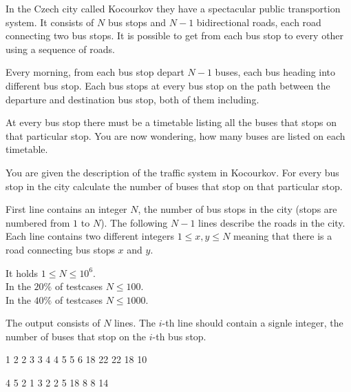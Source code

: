 





In the Czech city called Kocourkov they have a spectacular public transportion system.
It consists of $N$ bus stops and $N-1$ bidirectional roads, each road connecting two bus stops.
It is possible to get from each bus stop to every other using a sequence of roads.

Every morning, from each bus stop depart $N-1$ buses, each bus heading into different bus stop.
Each bus stops at every bus stop on the path between the departure and destination bus stop, both of them including.

At every bus stop there must be a timetable listing all the buses that stops on that particular stop.
You are now wondering, how many buses are listed on each timetable.


You are given the description of the traffic system in Kocourkov.
For every bus stop in the city calculate the number of buses that stop on that particular stop.


First line contains an integer $N$, the number of bus stops in the city (stops are numbered from $1$ to $N$).
The following $N-1$ lines describe the roads in the city.
Each line contains two different integers $1 \le x, y \le N$ meaning that there is a road connecting bus stops $x$ and $y$.

\smallskip
\noindent
It holds $1 \leq N \leq 10^6$.\\
In the $20\%$ of testcases $N \leq 100$.\\
In the $40\%$ of testcases $N \leq 1000$.


The output consists of $N$ lines. The $i$-th line should contain a signle integer, the number of buses that stop on the $i$-th bus stop.


1 2
2 3
3 4
4 5
5 6
18
22
22
18
10
\sampleEND

\bigskip

4 5
2 1
3 2
2 5
18
8
8
14
\sampleEND


